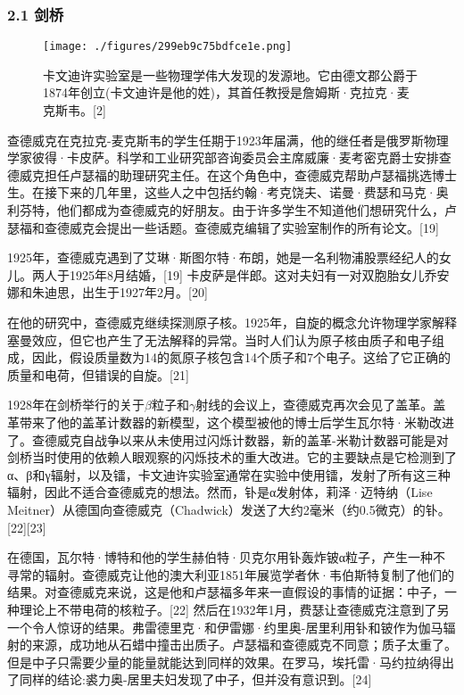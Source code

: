 \subsubsection{2.1 剑桥}
\begin{figure}[ht]
\centering
\texttt{[image: ./figures/299eb9c75bdfce1e.png]}
\caption{卡文迪许实验室是一些物理学伟大发现的发源地。它由德文郡公爵于1874年创立(卡文迪许是他的姓)，其首任教授是詹姆斯·克拉克·麦克斯韦。[2]} \label{fig_CHFR_1}
\end{figure}
查德威克在克拉克-麦克斯韦的学生任期于1923年届满，他的继任者是俄罗斯物理学家彼得·卡皮萨。科学和工业研究部咨询委员会主席威廉·麦考密克爵士安排查德威克担任卢瑟福的助理研究主任。在这个角色中，查德威克帮助卢瑟福挑选博士生。在接下来的几年里，这些人之中包括约翰·考克饶夫、诺曼·费瑟和马克·奥利芬特，他们都成为查德威克的好朋友。由于许多学生不知道他们想研究什么，卢瑟福和查德威克会提出一些话题。查德威克编辑了实验室制作的所有论文。[19]

1925年，查德威克遇到了艾琳·斯图尔特·布朗，她是一名利物浦股票经纪人的女儿。两人于1925年8月结婚，[19] 卡皮萨是伴郎。这对夫妇有一对双胞胎女儿乔安娜和朱迪思，出生于1927年2月。[20]

在他的研究中，查德威克继续探测原子核。1925年，自旋的概念允许物理学家解释塞曼效应，但它也产生了无法解释的异常。当时人们认为原子核由质子和电子组成，因此，假设质量数为14的氮原子核包含14个质子和7个电子。这给了它正确的质量和电荷，但错误的自旋。[21]

1928年在剑桥举行的关于$\beta$粒子和$\gamma$射线的会议上，查德威克再次会见了盖革。盖革带来了他的盖革计数器的新模型，这个模型被他的博士后学生瓦尔特·米勒改进了。查德威克自战争以来从未使用过闪烁计数器，新的盖革-米勒计数器可能是对剑桥当时使用的依赖人眼观察的闪烁技术的重大改进。它的主要缺点是它检测到了α、β和γ辐射，以及镭，卡文迪许实验室通常在实验中使用镭，发射了所有这三种辐射，因此不适合查德威克的想法。然而，钋是α发射体，莉泽·迈特纳（Lise Meitner）从德国向查德威克（Chadwick）发送了大约2毫米（约0.5微克）的钋。[22][23]

在德国，瓦尔特·博特和他的学生赫伯特·贝克尔用钋轰炸铍α粒子，产生一种不寻常的辐射。查德威克让他的澳大利亚1851年展览学者休·韦伯斯特复制了他们的结果。对查德威克来说，这是他和卢瑟福多年来一直假设的事情的证据：中子，一种理论上不带电荷的核粒子。[22] 然后在1932年1月，费瑟让查德威克注意到了另一个令人惊讶的结果。弗雷德里克·和伊雷娜·约里奥-居里利用钋和铍作为伽马辐射的来源，成功地从石蜡中撞击出质子。卢瑟福和查德威克不同意；质子太重了。但是中子只需要少量的能量就能达到同样的效果。在罗马，埃托雷·马约拉纳得出了同样的结论:裘力奥-居里夫妇发现了中子，但并没有意识到。[24]

